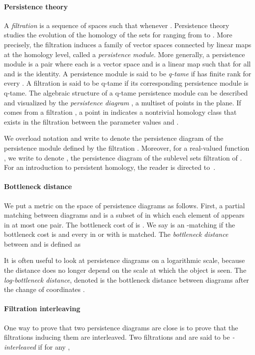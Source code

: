\documentclass[a4paper]{article}
\begin{document}
\paragraph{Persistence theory\\}
  A \emph{filtration}  is a sequence of spaces such that  whenever .
  Persistence theory studies the evolution of the homology of the sets  for  ranging from  to .
  More precisely, the filtration induces a family of vector spaces connected by linear maps at the homology level, called a \emph{persistence module}.
  More generally, a persistence module is a pair  where each  is a vector space and  is a linear map  such that  for all  and  is the identity.
  A persistence module is said to be \emph{q-tame} if  has finite rank for every .
  A filtration is said to be q-tame if its corresponding persistence module is q-tame.
  The algebraic structure of a q-tame persistence module  can be described and visualized by the \emph{persistence diagram} , a multiset of points in the plane.
  If  comes from a filtration , a point  in  indicates a nontrivial homology class that exists in the filtration between the parameter values  and .
  
  We overload notation and write  to denote the persistence diagram of the persistence module defined by the filtration .
  Moreover, for a real-valued function , we write  to denote , the persistence diagram of the sublevel sets filtration of .
  For an introduction to persistent homology, the reader is directed to~\cite{sspmCDGO,ctaiEH}.


\paragraph{Bottleneck distance\\}
  We put a metric on the space of persistence diagrams as follows.
  First, a partial matching  between diagrams  and  is a subset of  in which each element of  appears in at most one pair.
  The bottleneck cost of  is .
  We say  is an -matching if the bottleneck cost is  and every  in  or  with  is matched.
  The \emph{bottleneck distance} between  and  is defined as
  

  It is often useful to look at persistence diagrams on a logarithmic scale, because the distance does no longer depend on the scale at which the object is seen.
  The \emph{log-bottleneck distance}, denoted  is the bottleneck distance between diagrams after the change of coordinates .

\paragraph{Filtration interleaving\\}
One way to prove that two persistence diagrams are close is to prove that the filtrations inducing them are interleaved.
Two filtrations  and  are said to be \emph{-interleaved} if for any ,
\end{document}
